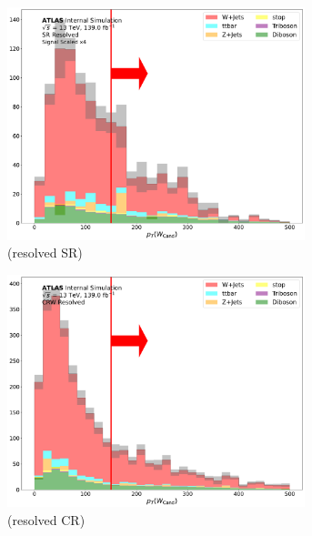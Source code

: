      \begin{figure}[htbp] \ContinuedFloat
    \begin{subfigure}{0.45\textwidth}
     \includegraphics[width = 0.95\textwidth]{Figures/App_SR_CR_distributions/SR1L_Resolved/WCand_pt_N_1.pdf}
    \caption{\Wcandpt (resolved SR)}
     \end{subfigure}
    \begin{subfigure}{0.45\textwidth}
     \includegraphics[width = 0.95\textwidth]{Figures/App_SR_CR_distributions/CRW_Resolved/WCand_pt_N_1.pdf}
     \caption{\Wcandpt (resolved \wjets CR)}
     \end{subfigure}   
    \begin{subfigure}{0.45\textwidth}

\end{subfigure}
\end{figure}
